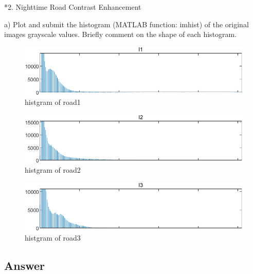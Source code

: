 \documentclass[
	12pt, %
]{fphw}
\makeatletter
\renewcommand{\section}{\@startsection{section}{1}{0mm}
  {-\baselineskip}{0.5\baselineskip}{\bf\leftline}}
\makeatother
\begin{document}

\section*{2. Nighttime Road Contrast Enhancement}

\begin{problem}
	a) Plot and submit the histogram (MATLAB function: imhist) of the original images grayscale values. Briefly comment on the shape of each histogram.
\end{problem}

\begin{figure}[H]
 
	\centering
	\includegraphics[width=1\columnwidth]{T2/result/hist1.png} 
	\caption{histgram of road1}
	\label{fig7}
\end{figure}
\begin{figure}[H]
 
	\centering
	\includegraphics[width=1\columnwidth]{T2/result/hist2.png} 
	\caption{histgram of road2}
	\label{fig8}
\end{figure}
\begin{figure}[H]
 
	\centering
	\includegraphics[width=1\columnwidth]{T2/result/hist3.png} 
	\caption{histgram of road3}
	\label{fig9}
\end{figure}
\subsection*{Answer} 
\end{document}
